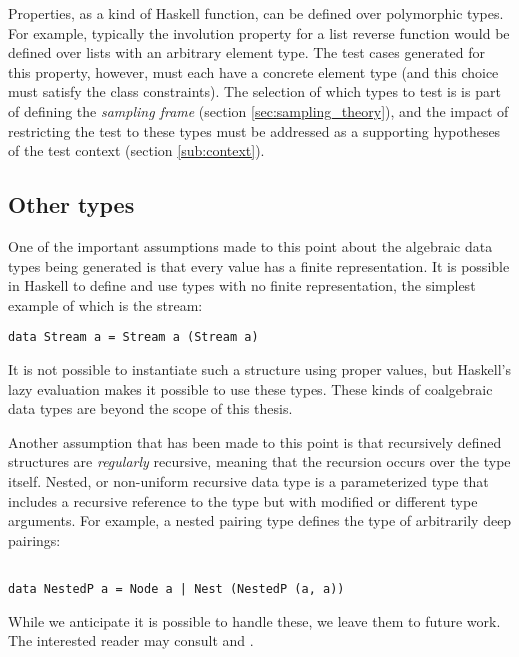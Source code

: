 Properties, as a kind of Haskell function, 
can be defined over polymorphic types.
For example, typically the involution property for a list reverse function
would be defined over lists with an arbitrary element type.
The test cases generated for this property, however,
must each have a concrete element type
(and this choice must satisfy the class constraints).
The selection of which types to test is 
is part of defining the \emph{sampling frame} (section \ref{sec:sampling_theory}),
and the impact of restricting the test to these types
must be addressed as a supporting hypotheses
of the test context (section \ref{sub:context}).

\subsection{Other types}\label{nonregrecurs}
One of the important assumptions made to this point 
about the algebraic data types being generated
is that every value has a finite representation.
It is possible in Haskell to define and use types with 
no finite representation,
the simplest example of which is the stream:
\begin{lstlisting}
data Stream a = Stream a (Stream a)
\end{lstlisting}
\noindent
It is not possible to instantiate such a structure using proper values,
but Haskell's lazy evaluation makes it possible to use these types.
These kinds of coalgebraic data types are beyond the scope of this thesis.

Another assumption that has been made to this point is that
recursively defined structures are \emph{regularly} recursive,
meaning that the recursion occurs over the type itself.
Nested, or non-uniform recursive data type is a parameterized type that
includes a recursive reference to the type but with modified or different type arguments.
For example, a nested pairing type defines the type of arbitrarily deep pairings:

\begin{lstlisting}

data NestedP a = Node a | Nest (NestedP (a, a))

\end{lstlisting}

While we anticipate it is possible to handle these, we leave them to future work.
The interested reader may consult
\cite{BlampiedThesis} and \cite{Joha07}.


